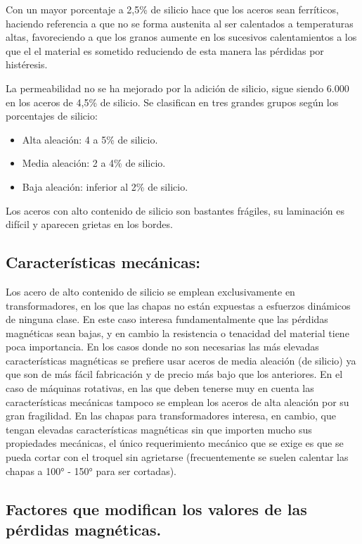 \documentclass[12pt,a4paper]{article}
\begin{document}
Con un mayor porcentaje a 2,5\% de silicio hace que los aceros sean ferríticos, haciendo referencia a que no se forma austenita al ser calentados a temperaturas altas, favoreciendo a que los granos aumente en los sucesivos calentamientos a los que el el material es sometido reduciendo de esta manera las pérdidas por histéresis.

La permeabilidad no se ha mejorado por la adición de silicio, sigue siendo 6.000 en los aceros de 4,5\% de silicio. Se clasifican en tres grandes grupos según los porcentajes de silicio: 

\begin{itemize}
    \item Alta aleación: 4 a 5\% de silicio.
    \item Media aleación: 2 a 4\% de silicio.
    \item Baja aleación: inferior al 2\% de silicio.
\end{itemize}

Los aceros con alto contenido de silicio son bastantes frágiles, su laminación es difícil y aparecen grietas en los bordes.

\subsection{Características mecánicas:}
Los acero de alto contenido de silicio se emplean exclusivamente en transformadores, en los que las chapas no están expuestas a esfuerzos dinámicos de ninguna clase. En este caso interesa fundamentalmente que las pérdidas magnéticas sean bajas, y en cambio la resistencia o tenacidad del material tiene poca importancia. En los casos donde no son necesarias las más elevadas características magnéticas se prefiere usar aceros de media aleación (de silicio) ya que son de más fácil fabricación y de precio más bajo que los anteriores. En el caso de máquinas rotativas, en las que deben tenerse muy en cuenta las características mecánicas tampoco se emplean los aceros de alta aleación por su gran fragilidad. En las chapas para transformadores interesa, en cambio, que tengan elevadas características magnéticas sin que importen mucho sus propiedades mecánicas, el único requerimiento mecánico que se exige es que se pueda cortar con el troquel sin agrietarse (frecuentemente se suelen calentar las chapas a 100° - 150° para ser cortadas).

\subsection{Factores que modifican los valores de las pérdidas magnéticas.}
\end{document}
